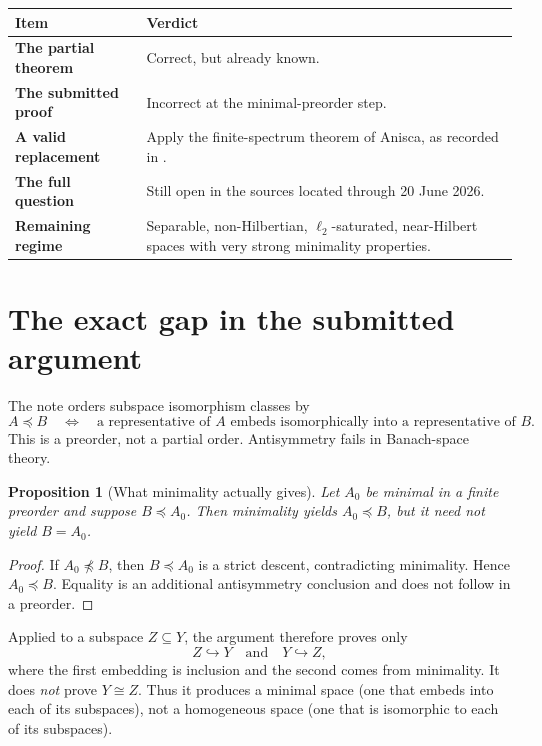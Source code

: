\documentclass[11pt]{article}
\newtheorem{proposition}[theorem]{Proposition}
\theoremstyle{definition}
\theoremstyle{remark}
\newcommand{\ellTwo}{\ell_2}
\newcommand{\iso}{\cong}
\newcommand{\embeds}{\hookrightarrow}
\begin{document}
\begin{center}
\begin{tabularx}{0.95\textwidth}{>{\bfseries}p{}X}
\toprule
Item & Verdict \\
\midrule
The partial theorem & Correct, but already known. \\
The submitted proof & Incorrect at the minimal-preorder step. \\
A valid replacement & Apply the finite-spectrum theorem of Anisca, as recorded in \cite[Theorem 6.6]{CCRF2023}. \\
The full question & Still open in the sources located through 20 June 2026. \\
Remaining regime & Separable, non-Hilbertian, \(\ellTwo\)-saturated, near-Hilbert spaces with very strong minimality properties. \\
\bottomrule
\end{tabularx}
\end{center}

\section{The exact gap in the submitted argument}

The note orders subspace isomorphism classes by
\[
  A\preceq B
  \quad\Longleftrightarrow\quad
  \text{a representative of }A\text{ embeds isomorphically into a representative of }B.
\]
This is a preorder, not a partial order.  Antisymmetry fails in Banach-space theory.

\begin{proposition}[What minimality actually gives]
Let \(A_0\) be minimal in a finite preorder and suppose \(B\preceq A_0\).  Then minimality yields \(A_0\preceq B\), but it need not yield \(B=A_0\).
\end{proposition}

\begin{proof}
If \(A_0\not\preceq B\), then \(B\preceq A_0\) is a strict descent, contradicting minimality.  Hence \(A_0\preceq B\).  Equality is an additional antisymmetry conclusion and does not follow in a preorder.
\end{proof}

Applied to a subspace \(Z\subseteq Y\), the argument therefore proves only
\[
  Z\embeds Y
  \quad\text{and}\quad
  Y\embeds Z,
\]
where the first embedding is inclusion and the second comes from minimality.  It does \emph{not} prove \(Y\iso Z\).  Thus it produces a minimal space (one that embeds into each of its subspaces), not a homogeneous space (one that is isomorphic to each of its subspaces).
\end{document}
